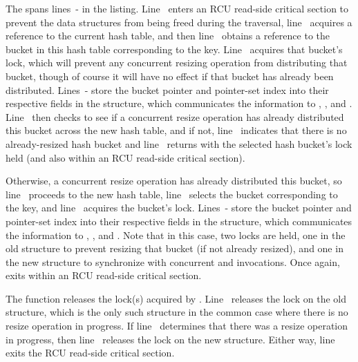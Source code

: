\begin{lineref}
The  spans
lines~- in the listing.
Line~ enters an RCU read-side critical section to prevent
the data structures from being freed during the traversal,
line~ acquires a reference to the current hash table, and then
line~ obtains a reference to the bucket in this hash table
corresponding to the key.
Line~ acquires that bucket's lock, which will prevent any concurrent
resizing operation from distributing that bucket, though of course it
will have no effect if that bucket has already been distributed.
Lines~- store the bucket pointer and
pointer-set index into their respective fields in the
 structure, which communicates the information to
, , and .
Line~ then checks to see if a concurrent resize
operation has already distributed this bucket across the new hash table,
and if not, line~ indicates that there is no
already-resized hash bucket and
line~ returns with the selected hash bucket's
lock held (and also within an RCU read-side critical section).

Otherwise, a concurrent resize operation has already distributed this
bucket, so line~ proceeds to the new hash table,
line~ selects the bucket corresponding to the key,
and line~ acquires the bucket's lock.
Lines~- store the bucket pointer and
pointer-set index into their respective fields in the
 structure, which communicates the information to
, , and .
Note that in this case, two locks are held, one in the old 
structure to prevent resizing that bucket (if not already resized),
and one in the new  structure to synchronize with
concurrent  and  invocations.
Once again,  exits within an RCU read-side critical
section.
\end{lineref}

\begin{lineref}
The  function releases the lock(s) acquired by
.
Line~ releases the lock on the old 
structure, which is the only such structure in the common case
where there is no resize operation in progress.
If line~ determines that there was a resize operation
in progress, then line~ releases the lock on the new
 structure.
Either way, line~ exits the RCU read-side critical
section.
\end{lineref}

